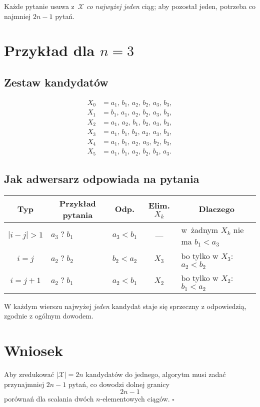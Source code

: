 \documentclass[11pt,a4paper]{article}
\begin{document}
Każde pytanie usuwa z~$\mathcal X$
\emph{co najwyżej jeden} ciąg;
aby pozostał jeden, potrzeba co najmniej $2n-1$ pytań.

\section*{Przykład dla $n=3$}

\subsection*{Zestaw kandydatów}

\[
\begin{aligned}
X_0 &= a_1,\,b_1,\,a_2,\,b_2,\,a_3,\,b_3,\\
X_1 &= b_1,\,a_1,\,a_2,\,b_2,\,a_3,\,b_3,\\
X_2 &= a_1,\,a_2,\,b_1,\,b_2,\,a_3,\,b_3,\\
X_3 &= a_1,\,b_1,\,b_2,\,a_2,\,a_3,\,b_3,\\
X_4 &= a_1,\,b_1,\,a_2,\,a_3,\,b_2,\,b_3,\\
X_5 &= a_1,\,b_1,\,a_2,\,b_2,\,b_3,\,a_3.
\end{aligned}
\]

\subsection*{Jak adwersarz odpowiada na pytania}

\renewcommand{\arraystretch}{1.25}
\begin{center}
\begin{tabular}{|c|l|c|c|l|}
\hline
\textbf{Typ} & \multicolumn{1}{c|}{\textbf{Przykład pytania}}
             & \textbf{Odp.} & \textbf{Elim. $X_k$} & \multicolumn{1}{c|}{\textbf{Dlaczego}}\\\hline
$|i-j|>1$ &
$a_3 \;?\; b_1$ &
$a_3<b_1$ &
--- &
w~żadnym $X_k$ nie ma $b_1<a_3$      \\\hline
$i=j$ &
$a_2 \;?\; b_2$ &
$b_2<a_2$ &
$X_3$ &
bo tylko w $X_3$: $a_2<b_2$          \\\hline
$i=j+1$ &
$a_2 \;?\; b_1$ &
$a_2<b_1$ &
$X_2$ &
bo tylko w $X_2$: $b_1<a_2$          \\\hline
\end{tabular}
\end{center}

W każdym wierszu najwyżej \emph{jeden} kandydat
staje się sprzeczny z odpowiedzią,
zgodnie z ogólnym dowodem.

\section*{Wniosek}

Aby zredukować $\lvert\mathcal X\rvert=2n$ kandydatów do jednego,
algorytm musi zadać przynajmniej $2n-1$ pytań,
co dowodzi dolnej granicy
\[
\boxed{\;2n-1\;}
\]
porównań dla scalania dwóch $n$‐elementowych ciągów.
\hfill$\square$
\end{document}
